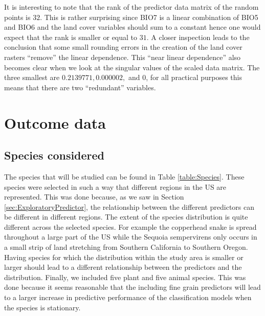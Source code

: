 It is interesting to note that the rank of the predictor data matrix of the random points is $32$. This is rather surprising since BIO7 is a linear combination of BIO5 and BIO6 and the land cover variables should sum to a constant hence one would expect that the rank is smaller or equal to $31$. A closer inspection leads to the conclusion that some small rounding errors in the creation of the land cover rasters ``remove'' the linear dependence. This ``near linear dependence'' also becomes clear when we look at the singular values of the scaled data matrix. The three smallest are $0.2139771, 0.000002,$ and $0$, for all practical purposes this means that there are two ``redundant'' variables.\\


\section{Outcome data}
\subsection{Species considered}
The species that will be studied can be found in Table \ref{table:Species}. These species were selected in such a way that different regions in the US are represented. This was done because, as we saw in Section \ref{sec:ExploratoryPredictor}, the relationship between the different predictors can be different in different regions. The extent of the species distribution is quite different across the selected species. For example the copperhead snake is spread throughout a large part of the US while the Sequoia sempervirens only occurs in a small strip of land stretching from Southern California to Southern Oregon. Having species for which the distribution within the study area is smaller or larger should lead to a different relationship between the predictors and the distribution. Finally, we included five plant and five animal species. This was done because it seems reasonable that the including fine grain predictors will lead to a larger increase in predictive performance of the classification models when the species is stationary.\\

